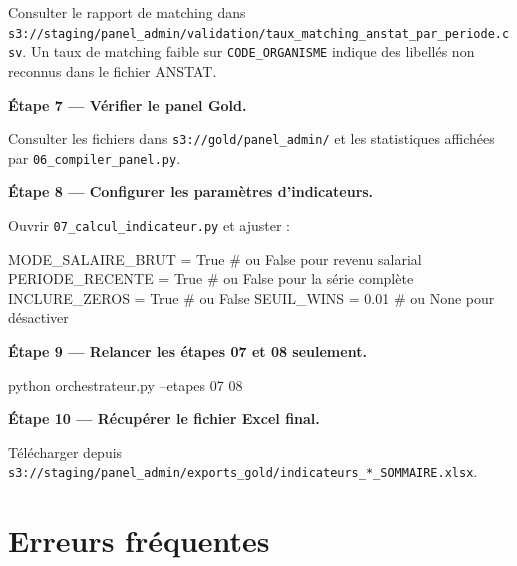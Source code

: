 \documentclass[12pt,a4paper,french]{report}
\newcommand{\bucket}[1]{\texttt{s3://#1}}
\begin{document}
Consulter le rapport de matching dans
\bucket{staging/panel\_admin/validation/taux\_matching\_anstat\_par\_periode.csv}.
Un taux de matching faible sur \texttt{CODE\_ORGANISME} indique des libellés
non reconnus dans le fichier ANSTAT.

\textbf{Étape 7 --- Vérifier le panel Gold.}

Consulter les fichiers dans \bucket{gold/panel\_admin/} et les statistiques
affichées par \texttt{06\_compiler\_panel.py}.

\textbf{Étape 8 --- Configurer les paramètres d'indicateurs.}

Ouvrir \texttt{07\_calcul\_indicateur.py} et ajuster :
\begin{codebox}[]
MODE\_SALAIRE\_BRUT = True   # ou False pour revenu salarial
PERIODE\_RECENTE   = True   # ou False pour la série complète
INCLURE\_ZEROS     = True   # ou False
SEUIL\_WINS        = 0.01   # ou None pour désactiver
\end{codebox}

\textbf{Étape 9 --- Relancer les étapes 07 et 08 seulement.}

\begin{codebox}[]
python orchestrateur.py --etapes 07 08
\end{codebox}

\textbf{Étape 10 --- Récupérer le fichier Excel final.}

Télécharger depuis
\bucket{staging/panel\_admin/exports\_gold/indicateurs\_*\_SOMMAIRE.xlsx}.

\section{Erreurs fréquentes}
\end{document}
